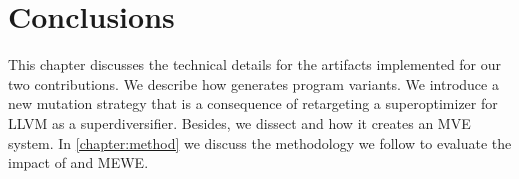 



\section*{Conclusions}

This chapter discusses the technical details for the artifacts implemented for our two contributions.
We describe how generates program variants.
We introduce a new mutation strategy that is a consequence of retargeting a superoptimizer for LLVM as a superdiversifier.
Besides, we dissect and how it creates an MVE system.
In \autoref{chapter:method} we discuss the methodology we follow to evaluate the impact of and MEWE.